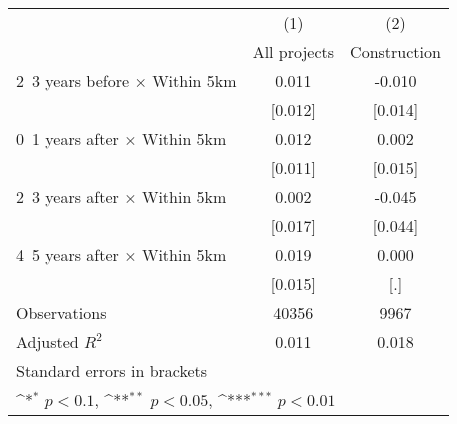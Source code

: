 {
\def\sym#1{\ifmmode^{#1}\else\(^{#1}\)\fi}
\begin{tabular}{l*{2}{c}}
\hline\hline
                    &\multicolumn{1}{c}{(1)}&\multicolumn{1}{c}{(2)}\\
                    &\multicolumn{1}{c}{All projects}&\multicolumn{1}{c}{Construction}\\
\hline
2~3 years before × Within 5km&       0.011         &      -0.010         \\
                    &     [0.012]         &     [0.014]         \\
0~1 years after × Within 5km&       0.012         &       0.002         \\
                    &     [0.011]         &     [0.015]         \\
2~3 years after × Within 5km&       0.002         &      -0.045         \\
                    &     [0.017]         &     [0.044]         \\
4~5 years after × Within 5km&       0.019         &       0.000         \\
                    &     [0.015]         &         [.]         \\
\hline
Observations        &       40356         &        9967         \\
Adjusted \(R^{2}\)  &       0.011         &       0.018         \\
\hline\hline
\multicolumn{3}{l}{\footnotesize Standard errors in brackets}\\
\multicolumn{3}{l}{\footnotesize \sym{*} \(p<0.1\), \sym{**} \(p<0.05\), \sym{***} \(p<0.01\)}\\
\end{tabular}
}

